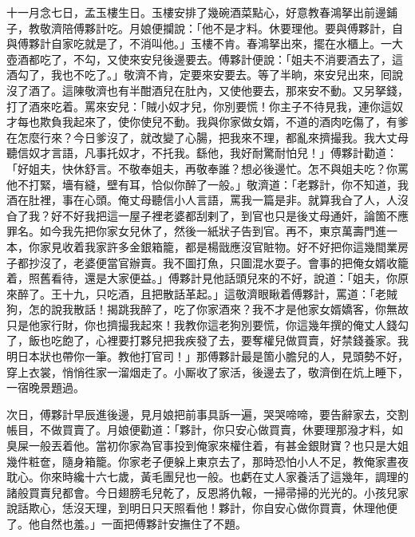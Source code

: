 十一月念七日，孟玉樓生日。玉樓安排了幾碗酒菜點心，好意教春鴻拏出前邊鋪子，教敬濟陪傅夥計吃。月娘便攔說：「他不是才料。休要理他。{}要與傅夥計，自與傅夥計自家吃就是了，不消叫他。」玉樓不肯。{}春鴻拏出來，擺在水櫃上。一大壺酒都吃了，不勾，又使來安兒後邊要去。傅夥計便說：「姐夫不消要酒去了，這酒勾了，我也不吃了。」敬濟不肯，定要來安要去。等了半晌，來安兒出來，囘說沒了酒了。這陳敬濟也有半酣酒兒在肚內，又使他要去，那來安不動。又另拏錢，打了酒來吃着。罵來安兒：「賊小奴才兒，你別要慌！你主子不待見我，連你這奴才每也欺負我起來了，使你使兒不動。我與你家做女婿，不道的酒肉吃傷了，有爹在怎麼行來？今日爹沒了，就改變了心腸，把我來不理，都亂來擠撮我。我大丈母聽信奴才言語，凡事托奴才，不托我。繇他，我好耐驚耐怕兒！」傅夥計勸道：「好姐夫，快休舒言。不敬奉姐夫，再敬奉誰？想必後邊忙。怎不與姐夫吃？你罵他不打緊，墻有縫，壁有耳，恰似你醉了一般。」敬濟道：「老夥計，你不知道，我酒在肚裡，事在心頭。俺丈母聽信小人言語，罵我一篇是非。就算我㒲了人，人沒㒲了我？好不好我把這一屋子裡老婆都刮剌了，到官也只是後丈母通奸，論箇不應罪名。如今我先把你家女兒休了，然後一紙狀子告到官。再不，東京萬壽門進一本，你家見收着我家許多金銀箱籠，都是楊戩應沒官賍物。好不好把你這幾間業房子都抄沒了，老婆便當官辦賣。我不圖打魚，只圖混水耍子。{}會事的把俺女婿收籠着，照舊看待，還是大家便益。」傅夥計見他話頭兒來的不好，說道：「姐夫，你原來醉了。王十九，只吃酒，且把散話革起。」這敬濟眼瞅着傅夥計，罵道：「老賊狗，怎的說我散話！揭跳我醉了，吃了你家酒來？我不才是他家女婿嬌客，你無故只是他家行財，你也擠撮我起來！我教你這老狗別要慌，你這幾年撰的俺丈人錢勾了，飯也吃飽了，心裡要打夥兒把我疾發了去，要奪權兒做買賣，好禁錢養家。{}我明日本狀也帶你一筆。教他打官司！」{}那傅夥計最是箇小膽兒的人，見頭勢不好，穿上衣裳，悄悄徃家一溜烟走了。小厮收了家活，後邊去了，敬濟倒在炕上睡下，一宿晚景題過。

次日，傅夥計早辰進後邊，見月娘把前事具訴一遍，哭哭啼啼，要告辭家去，交割帳目，不做買賣了。月娘便勸道：「夥計，你只安心做買賣，休要理那潑才料，如臭屎一般丟着他。當初你家為官事投到俺家來權住着，{}有甚金銀財寶？也只是大姐幾件粧奩，隨身箱籠。你家老子便躲上東京去了，那時恐怕小人不足，教俺家晝夜耽心。你來時纔十六七歲，黃毛團兒也一般。也虧在丈人家養活了這幾年，調理的諸般買賣兒都會。今日翅膀毛兒乾了，反恩將仇報，一掃帚掃的光光的。小孩兒家說話欺心，恁沒天理，到明日只天照看他！夥計，你自安心做你買賣，休理他便了。他自然也羞。」一面把傅夥計安撫住了不題。

